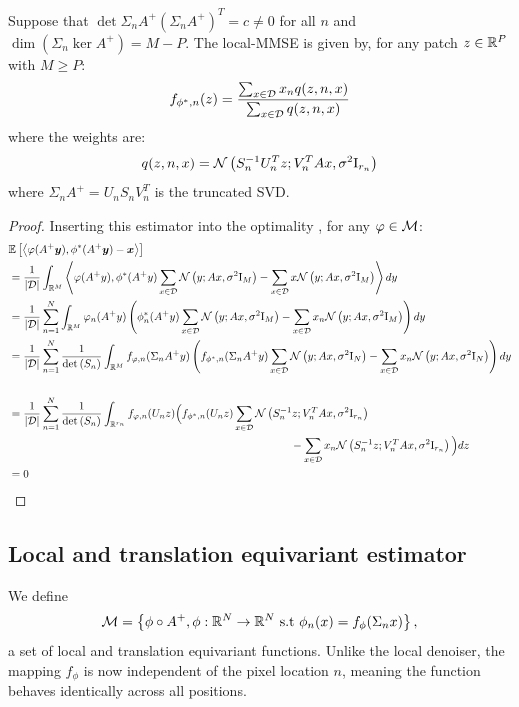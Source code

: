\documentclass[a4paper,10pt]{article}
\begin{document}
\begin{proposition}
    Suppose that $\det{\Sigma_n A^+ (\Sigma_n A^+)^T} = c \neq 0$ for all $n$ and $\dim(\Sigma_n \ker{A^+}) = M - P$.
    The local-MMSE is given by, for any patch $z \in \mathbb{R}^P$ with $M \geqslant P$: 
    \begin{equation*}
        f_{\phi^*, n}(z) = \frac{\sum_{x \in \mathcal{D}} x_n q(z, n, x)}{\sum_{x \in \mathcal{D}} q(z, n, x)}
    \end{equation*}
    where the weights are: 
    \begin{align*}
        q(z, n, x) = \mathcal{N}\left( {S_{n}^{-1} U_{n}^T z; V_{n}^T A x, \sigma^2 \mathrm{I}_{r_n}} \right)
    \end{align*}
    where $\Sigma_n A^+ = U_n S_n V_n^T$ is the truncated SVD. 
\end{proposition}
\begin{proof}
 Inserting this estimator into the optimality , for any $\varphi \in \mathcal{M}$:
\begin{align*}
    &\E{\inner{\varphi(A^+ \y), \phi^*(A^+  \y) - \x}}  \\
    &=  \frac{1}{|\D|} \int_{\R^M} \inner{\varphi(A^+  y), \phi^*(A^+  y) \sum_{x \in \D} \Normal{y; A x, \sigma^2 \Id_M} - \sum_{x \in \D} x \Normal{y; A x, \sigma^2 \Id_M}} dy \\
    &=  \frac{1}{|\D|} \sum_{n = 1}^{N} \int_{\R^M} \varphi_n (A^+  y) \left( \phi^*_n(A^+  y) \sum_{x \in \D} \Normal{y; A x, \sigma^2 \Id_M} - \sum_{x \in \D} x_n \Normal{y; A x, \sigma^2 \Id_M} \right) dy \\
    &=  \frac{1}{|\D|} \sum_{n = 1}^{N} \frac{1}{\det{S_n}} \int_{\R^M} f_{\varphi, n} (\Sigma_n A^+  y) \left( f_{\phi^*, n}(\Sigma_n A^+  y) \sum_{x \in \D} \Normal{y; A x, \sigma^2 \Id_N} - \sum_{x \in \D} x_n \Normal{y; A x, \sigma^2 \Id_N} \right) dy \\
    \\&= \frac{1}{|\D|} \sum_{n = 1}^{N} \frac{1}{\det{S_n}} \int_{\R^{r_n}} f_{\varphi, n} (U_{n}  z)  \Big(   f_{\phi^*, n}(U_{n}  z) \sum_{x \in \D} \Normal{S_{n}^{-1} z; V_{n}^T A x, \sigma^2 \Id_{r_n}} \\
    &\hspace{9cm} - \sum_{x \in \D} x_n \Normal{S_{n}^{-1} z; V_{n}^T A x, \sigma^2 \Id_{r_n}} \Big) dz
    \\&= 0
\end{align*}   
\end{proof}
\subsection{Local and translation equivariant estimator}
We define
\begin{equation}
    \mathcal{M} = \left\{\phi \circ A^+, \phi: \mathbb{R}^N \to \mathbb{R}^N \mbox{ s.t } \phi_n(x) = f_{\phi}(\Sigma_n x)\right\},
\end{equation}
a set of local and translation equivariant functions. Unlike the local denoiser, the mapping $f_{\phi}$ is now independent of the pixel location $n$, meaning the function behaves identically across all positions.
\end{document}
